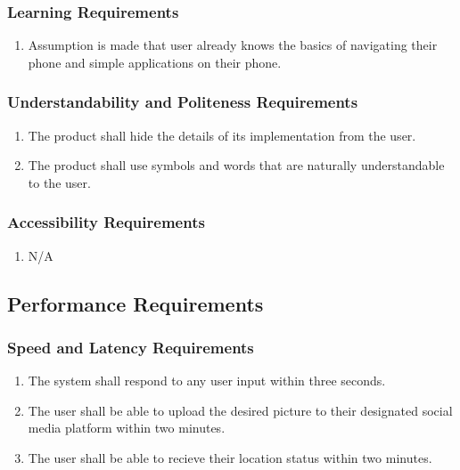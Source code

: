 \documentclass[]{article}
\begin{document}
\subsubsection{Learning Requirements}
\label{ssub:learning_requirements}
\begin{enumerate}[{UH}1. ]
	\item Assumption is made that user already knows the basics of navigating their phone and simple applications on their phone.
\end{enumerate}

\subsubsection{Understandability and Politeness Requirements}
\label{ssub:understandability_and_politeness_requirements}
\begin{enumerate}[{UH}1. ]
	\item The product shall hide the details of its implementation from the user.
	\item The product shall use symbols and words that are naturally understandable to the user.
\end{enumerate}

\subsubsection{Accessibility Requirements}
\label{ssub:accessibility_requirements}
\begin{enumerate}[{UH}1. ]
	\item N/A
\end{enumerate}


\subsection{Performance Requirements}
\label{sub:performance_requirements}

\subsubsection{Speed and Latency Requirements}
\label{ssub:speed_and_latency_requirements}
\begin{enumerate}[{PR}1. ]
	\item The system shall respond to any user input within three seconds.
	\item The user shall be able to upload the desired picture to their designated social media platform within two minutes.
	\item The user shall be able to recieve their location status within two minutes.
\end{enumerate}
\end{document}
